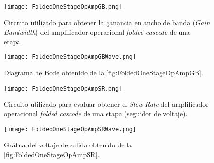 \begin{figure}[ht]
	\centering
	\texttt{[image: FoldedOneStageOpAmpGB.png]}
	\caption{Circuito utilizado para obtener la ganancia en ancho de banda (\textit{Gain Bandwidth}) del amplificador operacional \textit{folded cascode} de una etapa. \label{fig:FoldedOneStageOpAmpGB}}
\end{figure}

\begin{figure}[ht]
	\centering
	\texttt{[image: FoldedOneStageOpAmpGBWave.png]}
	\caption{Diagrama de Bode obtenido de la \autoref{fig:FoldedOneStageOpAmpGB}. \label{fig:FoldedOneStageOpAmpGBWF}}
\end{figure}

\begin{figure}[ht]
	\centering
	\texttt{[image: FoldedOneStageOpAmpSR.png]}
	\caption{Circuito utilizado para evaluar obtener el \textit{Slew Rate} del amplificador operacional \textit{folded cascode} de una etapa (seguidor de voltaje). \label{fig:FoldedOneStageOpAmpSR}}
\end{figure}

\begin{figure}[ht]
	\centering
	\texttt{[image: FoldedOneStageOpAmpSRWave.png]}
	\caption{Gráfica del voltaje de salida obtenido de la \autoref{fig:FoldedOneStageOpAmpSR}. \label{fig:FoldedOneStageOpAmpSRWF}}
\end{figure}